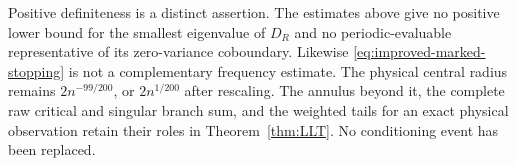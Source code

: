 Positive definiteness is a distinct assertion. The estimates above give
no positive lower bound for the smallest eigenvalue of $D_R$ and no
periodic-evaluable representative of its zero-variance coboundary.
Likewise \eqref{eq:improved-marked-stopping} is not a complementary
frequency estimate. The physical central radius remains
$2n^{-99/200}$, or $2n^{1/200}$ after rescaling. The annulus beyond it,
the complete raw critical and singular branch sum, and the weighted
tails for an exact physical observation retain their roles in
Theorem~\ref{thm:LLT}. No conditioning event has been replaced.
